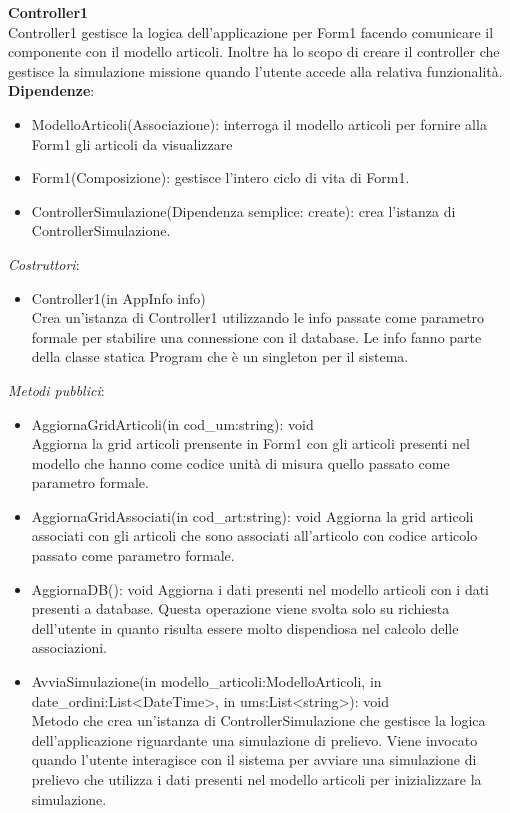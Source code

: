 \textbf{Controller1}\\
Controller1 gestisce la logica dell'applicazione per Form1 facendo comunicare il componente con il modello articoli.
Inoltre ha lo scopo di creare il controller che gestisce la simulazione missione quando l'utente accede alla relativa funzionalità.
\textbf{Dipendenze}:
\begin{itemize}
    \item ModelloArticoli(Associazione): interroga il modello articoli per fornire alla Form1 gli articoli da visualizzare\\
    \item Form1(Composizione): gestisce l'intero ciclo di vita di Form1.
    \item ControllerSimulazione(Dipendenza semplice: create): crea l'istanza di ControllerSimulazione.
\end{itemize}
\textit{Costruttori}:\\
\begin{itemize}
    \item Controller1(in AppInfo info)\\
    Crea un'istanza di Controller1 utilizzando le info passate come parametro formale per stabilire una connessione con il database.
    Le info fanno parte della classe statica Program che è un singleton per il sistema.
\end{itemize}
\textit{Metodi pubblici}:\\
\begin{itemize}
    \item AggiornaGridArticoli(in cod\_um:string): void\\
    Aggiorna la grid articoli prensente in Form1 con gli articoli presenti nel modello che hanno come codice unità di misura quello passato come parametro formale.
    \item AggiornaGridAssociati(in cod\_art:string): void
    Aggiorna la grid articoli associati con gli articoli che sono associati all'articolo con codice articolo passato come parametro formale.
    \item AggiornaDB(): void
    Aggiorna i dati presenti nel modello  articoli con i dati presenti a database.
    Questa operazione viene svolta solo su richiesta dell'utente in quanto risulta essere molto dispendiosa nel calcolo delle associazioni.
    \item AvviaSimulazione(in modello\_articoli:ModelloArticoli, in date\_ordini:List<DateTime>, in ums:List<string>): void \\
    Metodo che crea un'istanza di ControllerSimulazione che gestisce la logica dell'applicazione riguardante una simulazione di prelievo.
    Viene invocato quando l'utente interagisce con il sistema per avviare una simulazione di prelievo che utilizza i dati presenti nel modello articoli
    per inizializzare la simulazione.
\end{itemize} 
